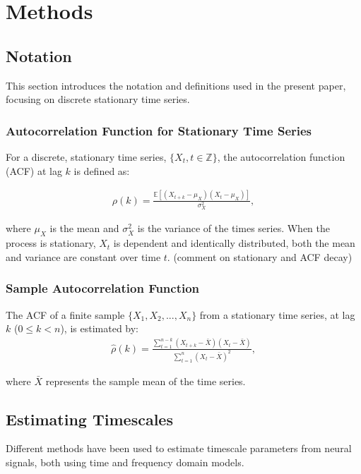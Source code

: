 \documentclass[main.tex]{subfiles}
\begin{document}
\section{Methods}

\subsection{Notation}

This section introduces the notation and definitions used in the present paper, focusing on discrete stationary time series.

\subsubsection*{Autocorrelation Function for Stationary Time Series}

For a discrete, stationary time series, $\{X_t, t\in\mathbb{Z}\}$, the autocorrelation function (ACF) at lag $k$ is defined as:

\begin{align*}
    \rho(k) = \frac{\mathbb{E}[(X_{t+k} - \mu_X)(X_t - \mu_X)]}{\sigma_X^2},
\end{align*}

where $\mu_X$ is the mean and $\sigma^2_X$ is the variance of the times series. When the process is stationary, $X_t$ is dependent and identically distributed, both the mean and variance are constant over time $t$. (comment on stationary and ACF decay)\\

\subsubsection*{Sample Autocorrelation Function}

The ACF of a finite sample $\{X_1, X_2, ..., X_n\}$ from a stationary time series, at lag $k$ ($0 \le k < n$), is estimated by:
\begin{align*}
    \hat \rho(k) = \frac{\sum_{t=1}^{n-k}(X_{t+k} - \bar X)(X_t - \bar X)}{\sum_{t=1}^n(X_t - \bar X)^2},
\end{align*}

where $\bar X$ represents the sample mean of the time series.

\subsection{Estimating Timescales}
Different methods have been used to estimate timescale parameters from neural signals, both using time and frequency domain models.\\
\end{document}
